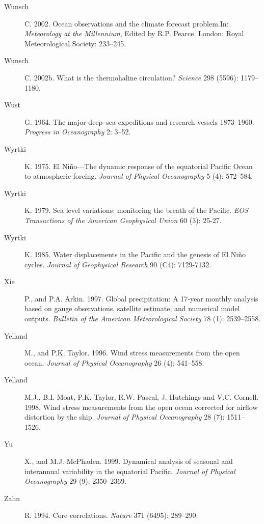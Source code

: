 \begin{description}
\item [Wunsch]C. 2002. Ocean observations and the climate forecast
  problem.In: \textit{Meteorology at the Millennium}, Edited by
  R.P. Pearce. London: Royal Meteorological Society: 233--245.

\item [Wunsch]C. 2002b. What is the thermohaline circulation?
  \textit{Science} 298 (5596): 1179--1180.

\item [Wust]G. 1964. The major deep--sea expeditions and research
  vessels 1873--1960. \textit{Progress in Oceanography} 2: 3--52.

\item [Wyrtki]K. 1975. El Ni\~{n}o---The dynamic response of the
  equatorial Pacific Ocean to atmospheric forcing. \textit{Journal of
    Physical Oceanography} 5 (4): 572--584.

\item [Wyrtki]K. 1979. Sea level variations: monitoring the breath of
  the Pacific. \textit{EOS Transactions of the American Geophysical
    Union} 60 (3): 25-27.

\item [Wyrtki]K. 1985. Water displacements in the Pacific and the
  genesis of El Ni\~{n}o cycles. \textit{Journal of Geophysical
    Research} 90 (C4): 7129-7132.
	
\item [Xie]P., and P.A. Arkin. 1997. Global precipitation: A 17-year
  monthly analysis based on gauge observations, satellite estimate,
  and numerical model outputs. \textit{ Bulletin of the American
    Meteorological Society} 78 (1): 2539--2558.

\item [Yelland]M., and P.K. Taylor. 1996. Wind stress measurements
  from the open ocean. \textit{Journal of Physical Oceanography} 26
  (4): 541--558.

\item [Yelland]M.J., B.I. Moat, P.K. Taylor, R.W. Pascal, J. Hutchings
  and V.C. Cornell. 1998. Wind stress measurements from the open ocean
  corrected for airflow distortion by the ship. \textit{Journal of
    Physical Oceanography} 28 (7): 1511--1526.

\item [Yu]X., and M.J. McPhaden. 1999. Dynamical analysis of seasonal
  and interannual variability in the equatorial
  Pacific. \textit{Journal of Physical Oceanography} 29 (9):
  2350--2369.

\item [Zahn]R. 1994. Core correlations. \textit{Nature} 371 (6495):
  289--290.

\end{description}
